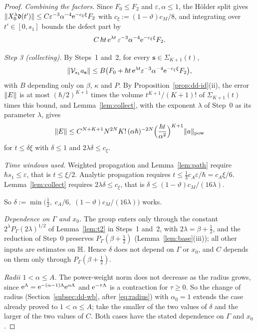 \begin{proof}
\emph{Combining the factors.} Since $F_0\le F_2$ and $\varepsilon,\alpha\le1$, the H\"older split gives
$\lVert X_0^\lambda\mathfrak d(t')\rVert\le C\varepsilon^{-3}\alpha^{-4}\mathrm{e}^{-c_\xi\xi}F_2$ with $c_\xi:=(1-\vartheta)c_M/8$, and integrating over
$t'\in[0,s_1]$ bounds the defect part by
\[
C\,\hbar t\,\mathrm{e}^{\lambda t}\,\varepsilon^{-3}\alpha^{-4}\mathrm{e}^{-c_\xi\xi}F_2 .
\]

\medskip\noindent\emph{Step 3 (collecting).} By Steps~1 and~2, for every $\mathbf s\in\Sigma_{K+1}(t)$,
\[
\lVert \mathcal V_{s_1}a_{\mathbf s}\rVert\le B\bigl(F_0+\hbar t\,\mathrm{e}^{\lambda t}\varepsilon^{-3}\alpha^{-4}\mathrm{e}^{-c_\xi\xi}F_2\bigr),
\]
with $B$ depending only on $\beta$, $\kappa$ and $P$. By Proposition~\ref{prop:dd-id}(ii), the error $\lVert E\rVert$ is at most $(\hbar/2)^{K+1}$
times the volume $t^{K+1}/(K+1)!$ of $\Sigma_{K+1}(t)$ times this bound, and Lemma~\ref{lem:collect}, with the exponent $\lambda$ of Step~0 as its parameter $\lambda$, gives
\[
\lVert E\rVert\le C^{N+K+1}N^{2N}K!\,(\alpha\hbar)^{-2N}\Bigl(\frac{\hbar t}{\alpha^2}\Bigr)^{K+1}\lVert a\rVert_{\mathrm{pow}}
\]
for $t\le\delta\xi$ with $\delta\le1$ and $2\lambda\delta\le c_\xi$.

\medskip\noindent\emph{Time windows used.} Weighted propagation and Lemma~\ref{lem:path} require $\hbar s_1\le\varepsilon$, that is $t\le\xi/2$.
Analytic propagation requires $t\le\tfrac13c_A\varepsilon/\hbar=c_A\xi/6$.
Lemma~\ref{lem:collect} requires $2\lambda\delta\le c_\xi$, that is $\delta\le(1-\vartheta)c_M/(16\lambda)$.

So $\delta:=\min\bigl(\tfrac12,\;c_A/6,\;(1-\vartheta)c_M/(16\lambda)\bigr)$ works.

\medskip\noindent\emph{Dependence on $\Gamma$ and $x_0$.} The group enters only through the constant $2^\lambda P_\Gamma(2\lambda)^{1/2}$ of
Lemma~\ref{lem:t2} in Steps~1 and~2, with $2\lambda=\beta+\tfrac12$, and the reduction of Step~0 preserves $P_\Gamma(\beta+\tfrac12)$
(Lemma~\ref{lem:base}(iii)); all other inputs are estimates on $\mathbb{H}$. Hence $\delta$ does not depend on $\Gamma$ or $x_0$, and $C$
depends on them only through $P_\Gamma(\beta+\tfrac12)$.

\medskip\noindent\emph{Radii $1<\alpha\le A$.} The power-weight norm does not decrease as the radius grows, since
$\mathrm{e}^{\Lambda}=\mathrm{e}^{-(\alpha-1)\Lambda}\mathrm{e}^{\alpha\Lambda}$ and $\mathrm{e}^{-\tau\Lambda}$ is a contraction for $\tau\ge0$. So the change of radius
(Section~\ref{subsec:dd-wb}, after \eqref{eq:radius}) with $\alpha_0=1$ extends the case already proved to $1<\alpha\le A$; take the smaller of the
two values of $\delta$ and the larger of the two values of $C$. Both cases have the stated dependence on $\Gamma$ and $x_0$.
\end{proof}


